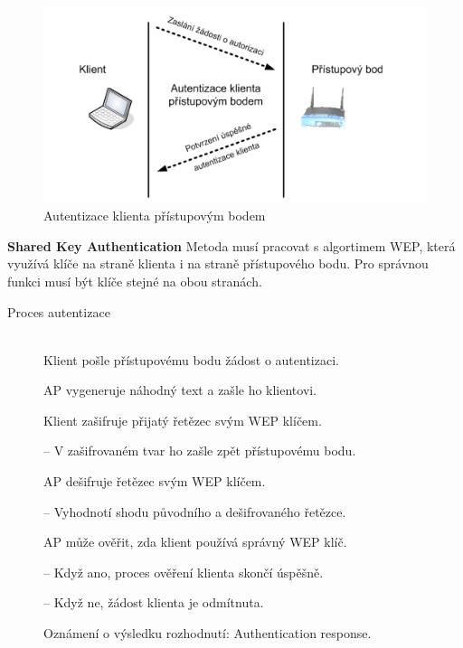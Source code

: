 \begin{figure}[ht]
\centering
  \begin{center}
    \includegraphics[scale=0.5]{images/OSA.png}
  \end{center}
  \caption[Autentizace klienta přístupovým bodem]{Autentizace klienta přístupovým bodem}
\end{figure}
\textbf{Shared Key Authentication} Metoda musí pracovat s algortimem WEP, která využívá klíče na straně klienta i na straně přístupového bodu. Pro správnou funkci musí být klíče stejné na obou stranách.
\begin{description}
    \item [Proces autentizace] \hfill \\
    Klient pošle přístupovému bodu žádost o autentizaci. \par
    AP vygeneruje náhodný text a zašle ho klientovi. \par
    Klient zašifruje přijatý řetězec svým WEP klíčem. \par
    -- V zašifrovaném tvar ho zašle zpět přístupovému bodu. \par
    AP dešifruje řetězec svým WEP klíčem. \par
    -- Vyhodnotí shodu původního a dešifrovaného řetězce. \par
    AP může ověřit, zda klient používá správný WEP klíč. \par
    -- Když ano, proces ověření klienta skončí úspěšně. \par
    -- Když ne, žádost klienta je odmítnuta. \par
    Oznámení o výsledku rozhodnutí: Authentication response. \par
\end{description}
